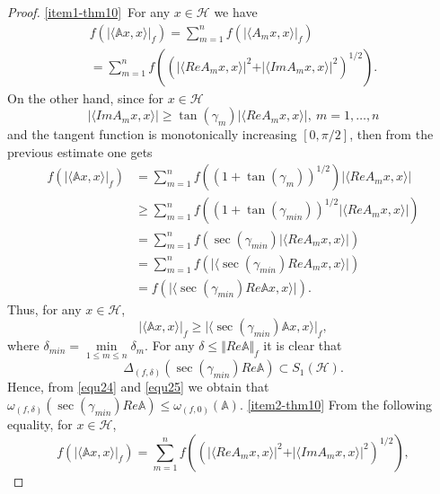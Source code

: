 \documentclass[12pt]{article}
\begin{document}
\begin{proof}
\noindent \ref{item1-thm10}\ For any $ x\in \mathcal{H} $ we have
\begin{multline*}
f\left( \vert \langle \mathbb{A} x,x \rangle \vert_{f} \right) = \sum\limits_{m=1}^{n} f\left( \vert \langle A_{m} x,x \rangle \vert_{f} \right) \\
= \sum\limits_{m=1}^{n}f\left( \left( \vert \langle ReA_{m} x,x \rangle \vert^{2} + \vert \langle ImA_{m} x,x \rangle \vert^{2} \right)^{1/2} \right).
\end{multline*}
On the other hand, since for $ x\in \mathcal{H} $
\[
\vert \langle ImA_{m}x,x\rangle \vert \geq \tan(\gamma_{m}) \vert \langle ReA_{m}x,x\rangle \vert , \ m=1,\ldots, n
\]
and the tangent function is monotonically increasing $ \left[ 0, {\pi/2}\right]$, then from the previous estimate one gets
\begin{align*}
f\left( \vert \langle \mathbb{A} x,x \rangle \vert_{f} \right) &= \sum\limits_{m=1}^{n}f\left( \left(1+\tan(\gamma_{m}) \right)^{1/2}  \right) \vert \langle ReA_{m} x,x \rangle \vert \\
&\geq \sum\limits_{m=1}^{n}f\left( \left(1+\tan(\gamma_{min}) \right)^{1/2}  \vert \langle ReA_{m} x,x \rangle \vert \right) \\
&= \sum\limits_{m=1}^{n}f\left( \sec(\gamma_{min}) \vert \langle ReA_{m} x,x \rangle \vert \right)  \\
&= \sum\limits_{m=1}^{n}f\left( \vert \langle \sec(\gamma_{min}) ReA_{m} x,x \rangle \vert \right)  \\
&= f\left( \vert \langle \sec(\gamma_{min}) Re\mathbb{A} x,x \rangle \vert \right).
\end{align*}
Thus, for any $ x\in \mathcal{H} $,
\begin{equation}
\label{equ24}
\vert \langle \mathbb{A} x,x \rangle \vert_{f}\geq \vert \langle \sec(\gamma_{min})\mathbb{A} x,x \rangle \vert_{f},
\end{equation}
where $ \delta_{min}=\min\limits_{1\leq m \leq n}\delta_{m}. $
For any $ \delta\leq \Vert Re \mathbb{A} \Vert_{f} $ it is clear that
\begin{equation}
\label{equ25}
\Delta_{(f,\delta)} (\sec(\gamma_{min})Re\mathbb{A})\subset S_{1}(\mathcal{H}).
\end{equation}
Hence, from \eqref{equ24} and \eqref{equ25} we obtain that
\(
\omega_{(f,\delta)}(\sec(\gamma_{min})Re \mathbb{A})\leq \omega_{(f,0)}(\mathbb{A}).
\)
\noindent \ref{item2-thm10} From the following equality, for $ x\in \mathcal{H} $,
\[
f\left( \vert \langle \mathbb{A} x,x \rangle \vert_{f} \right) = \sum\limits_{m=1}^{n}f\left( \left( \vert \langle ReA_{m} x,x \rangle \vert^{2} + \vert \langle ImA_{m} x,x \rangle \vert^{2} \right)^{1/2} \right),
\]
\end{proof}
\end{document}
